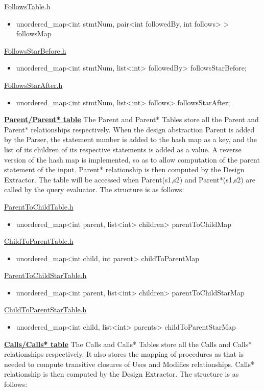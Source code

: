 \documentclass[12pt]{article}
\begin{document}
{\underline{FollowsTable.h}
\begin{itemize}
\item unordered\_map<int stmtNum, pair<int followedBy, int follows> > followsMap
\end{itemize}
{\underline{FollowsStarBefore.h}
\begin{itemize}
\item unordered\_map<int stmtNum, list<int> followedBy> followsStarBefore;
\end{itemize}
{\underline{FollowsStarAfter.h}
\begin{itemize}
\item unordered\_map<int stmtNum, list<int> follows> followsStarAfter;
\end{itemize}
\textbf{\underline{Parent/Parent* table}}
\newline The Parent and Parent* Tables store all the Parent and Parent* relationships respectively. When the design abstraction Parent is added by the Parser, the statement number is added to the hash map as a key, and the list of its children of its respective statements is added as a value. A reverse version of the hash map is implemented, so as to allow computation of the parent statement of the input. Parent* relationship is then computed by the Design Extractor. The table will be accessed when Parent(s1,s2) and Parent*(s1,s2) are called by the query evaluator. The structure is as follows: \newline
{\underline{ParentToChildTable.h}
\begin{itemize}
\item unordered\_map<int parent, list<int> children> parentToChildMap
\end{itemize}
{\underline{ChildToParentTable.h}
\begin{itemize}
\item unordered\_map<int child, int parent> childToParentMap
\end{itemize}
{\underline{ParentToChildStarTable.h}
\begin{itemize}
\item unordered\_map<int parent, list<int> children> parentToChildStarMap
\end{itemize}
{\underline{ChildToParentStarTable.h}
\begin{itemize}
\item unordered\_map<int child, list<int> parents> childToParentStarMap
\end{itemize}
\textbf{\underline{Calls/Calls* table}}
\newline The Calls and Calls* Tables store all the Calls and Calls* relationships respectively. It also stores the mapping of procedures as that is needed to compute transitive closures of Uses and Modifies relationships. Calls* relationship is then computed by the Design Extractor. The structure is as follows: \newline
}}}}}}}
\end{document}
